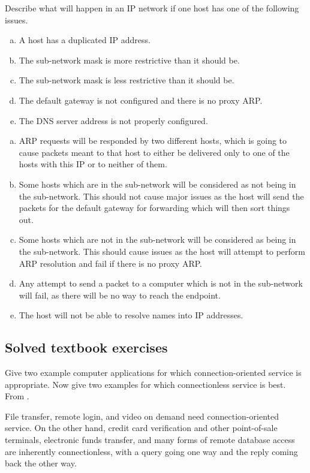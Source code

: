 \begin{Exercise}
Describe what will happen in an IP network if one host has one of the following issues.
\begin{enumerate}[a)]
\item A host has a duplicated IP address.
\item The sub-network mask is more restrictive than it should be.
\item The sub-network mask is less restrictive than it should be.
\item The default gateway is not configured and there is no proxy ARP.
\item The DNS server address is not properly configured.
\end{enumerate}
\end{Exercise}
\begin{Answer}
\begin{enumerate}[a)]
\item ARP requests will be responded by two different hosts, which is going to cause packets meant to that host to either be delivered only to one of the hosts with this IP or to neither of them.
\item Some hosts which are in the sub-network will be considered as not being in the sub-network.
This should not cause major issues as the host will send the packets for the default gateway for forwarding which will then sort things out.
\item Some hosts which are not in the sub-network will be considered as being in the sub-network. This should cause issues as the host will attempt to perform ARP resolution and fail if there is no proxy ARP.
\item Any attempt to send a packet to a computer which is not in the sub-network will fail, as there will be no way to reach the endpoint.
\item The host will not be able to resolve names into IP addresses.
\end{enumerate}
\end{Answer}

\subsection{Solved textbook exercises}
\setcounter{Exercise}{0}

\begin{Exercise}
Give two example computer applications for which connection-oriented service is appropriate.
Now give two examples for which connectionless service is best.
From \cite{computer-networks-tanenbaum-2012}.
\end{Exercise}
\begin{Answer}
File transfer, remote login, and video on demand need connection-oriented service.
On the other hand, credit card verification and other point-of-sale terminals, electronic funds transfer, and many forms of remote database access are inherently connectionless, with a query going one way and the reply coming back the other way.
\end{Answer}

